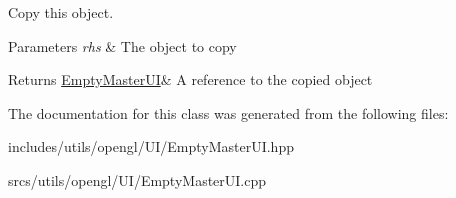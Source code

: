Copy this object. 


\begin{DoxyParams}{Parameters}
{\em rhs} & The object to copy \\
\hline
\end{DoxyParams}
\begin{DoxyReturn}{Returns}
\hyperlink{class_empty_master_u_i}{Empty\+Master\+UI}\& A reference to the copied object 
\end{DoxyReturn}


The documentation for this class was generated from the following files\+:\begin{DoxyCompactItemize}
\item 
includes/utils/opengl/\+U\+I/Empty\+Master\+U\+I.\+hpp\item 
srcs/utils/opengl/\+U\+I/Empty\+Master\+U\+I.\+cpp\end{DoxyCompactItemize}
